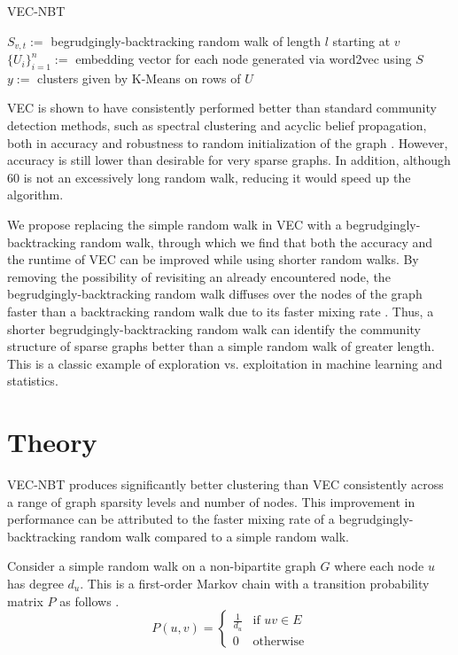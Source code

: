 \documentclass{article} %
\begin{document}
\begin{algorithm}
    \caption{VEC-NBT}

    
        {$S_{v,t} := $ begrudgingly-backtracking random walk of length $l$ starting at $v$}
    $\{U_i\}_{i=1}^{n} := $ embedding vector for each node generated via word2vec using $S$\\
    $y := $ clusters given by K-Means on rows of $U$
\end{algorithm}

VEC is shown to have consistently performed better than standard community detection methods, such as spectral clustering and acyclic belief propagation, both in accuracy and robustness to random initialization of the graph \cite{NodeEmbed}. However, accuracy is still lower than desirable for very sparse graphs. In addition, although 60 is not an excessively long random walk, reducing it would speed up the algorithm.

We propose replacing the simple random walk in VEC with a begrudgingly-backtracking random walk, through which we find that both the accuracy and the runtime of VEC can be improved while using shorter random walks. By removing the possibility of revisiting an already encountered node, the begrudgingly-backtracking random walk diffuses over the nodes of the graph faster than a backtracking random walk due to its faster mixing rate \cite{Alon,NBT-Ihara}. Thus, a shorter begrudgingly-backtracking random walk can identify the community structure of sparse graphs better than a simple random walk of greater length. This is a classic example of exploration vs. exploitation in machine learning and statistics.

\section{Theory}

VEC-NBT produces significantly better clustering than VEC consistently across a range of graph sparsity levels and number of nodes. This improvement in performance can be attributed to the faster mixing rate of a begrudgingly-backtracking random walk compared to a simple random walk.

Consider a simple random walk on a non-bipartite graph $G$  where each node $u$ has degree $d_u$. This is a first-order Markov chain with a transition probability matrix $P$ as follows \cite{Lovasz}.
\[
    P(u,v) = 
    \begin{cases} 
        \displaystyle\frac{1}{d_u} & \text{if } uv \in E \\
        0 & \text{otherwise} 
    \end{cases}
\]
\end{document}

